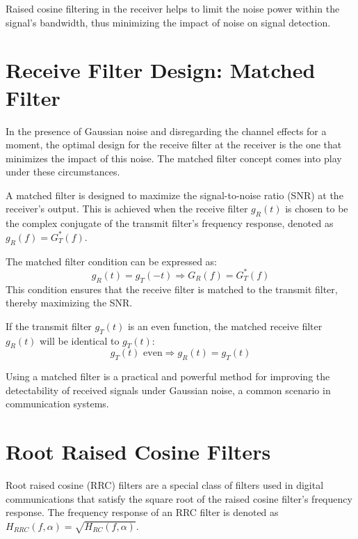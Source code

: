 Raised cosine filtering in the receiver helps to limit the noise power within the signal's bandwidth, thus minimizing the impact of noise on signal detection.

\section*{Receive Filter Design: Matched Filter}

In the presence of Gaussian noise and disregarding the channel effects for a moment, the optimal design for the receive filter at the receiver is the one that minimizes the impact of this noise. The matched filter concept comes into play under these circumstances.

A matched filter is designed to maximize the signal-to-noise ratio (SNR) at the receiver's output. This is achieved when the receive filter \( g_R(t) \) is chosen to be the complex conjugate of the transmit filter's frequency response, denoted as \( g_R(f) = G_T^*(f) \).

The matched filter condition can be expressed as:
\[ g_R(t) = g_T(-t) \Rightarrow G_R(f) = G_T^*(f) \]
This condition ensures that the receive filter is matched to the transmit filter, thereby maximizing the SNR.

If the transmit filter \( g_T(t) \) is an even function, the matched receive filter \( g_R(t) \) will be identical to \( g_T(t) \):
\[ g_T(t) \text{ even} \Rightarrow g_R(t) = g_T(t) \]

Using a matched filter is a practical and powerful method for improving the detectability of received signals under Gaussian noise, a common scenario in communication systems.

\section*{Root Raised Cosine Filters}

Root raised cosine (RRC) filters are a special class of filters used in digital communications that satisfy the square root of the raised cosine filter's frequency response. The frequency response of an RRC filter is denoted as \( H_{RRC}(f, \alpha) = \sqrt{H_{RC}(f, \alpha)} \).

